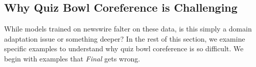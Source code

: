 
\subsection{Why Quiz Bowl Coreference is Challenging}

While models trained on newswire falter on these data, is this simply a domain
adaptation issue or something deeper?  In the rest of this section, we examine
specific examples to understand why quiz bowl coreference is so difficult. We
begin with examples that \emph{Final} gets wrong.

